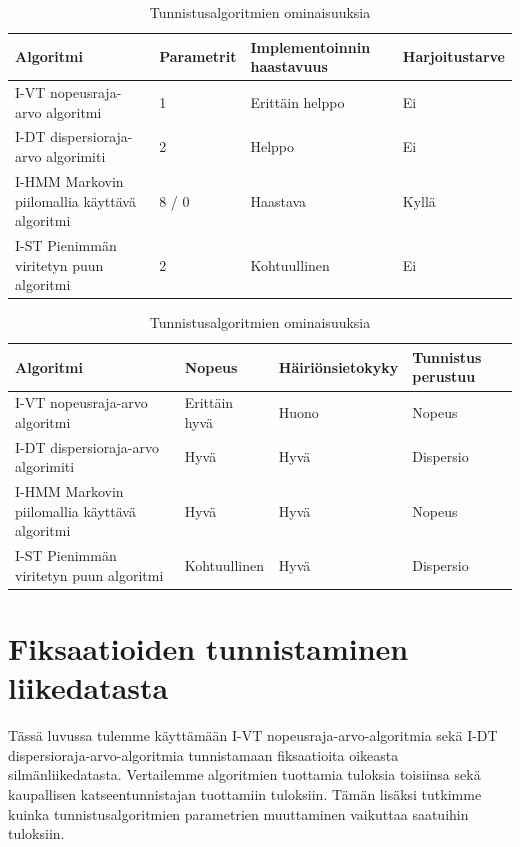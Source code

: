 		\begin{table}
    \begin{tabular}{| p{4cm} | p{3cm} | p{3cm}| p{3.5cm} |}
    \hline
    Algoritmi & Parametrit & Implementoinnin haastavuus & Harjoitustarve \\ \hline
    I-VT nopeusraja-arvo algoritmi & 1 & Erittäin helppo & Ei\\ \hline
    I-DT dispersioraja-arvo algorimiti & 2 & Helppo & Ei \\ \hline
    I-HMM Markovin piilomallia käyttävä algoritmi & 8 / 0 & Haastava & Kyllä \\ \hline
		I-ST Pienimmän viritetyn puun algoritmi & 2 & Kohtuullinen & Ei \\
    \hline
    \end{tabular}
		
		\vspace*{0.2 cm}
		
    \begin{tabular}{| p{4cm} | p{3cm} | p{3cm} |  p{3.5cm} |}
    \hline
    Algoritmi & Nopeus & Häiriönsietokyky & Tunnistus perustuu  \\ \hline
    I-VT nopeusraja-arvo algoritmi  & Erittäin hyvä & Huono  & Nopeus \\ \hline
    I-DT dispersioraja-arvo algorimiti  & Hyvä & Hyvä & Dispersio\\ \hline
    I-HMM Markovin piilomallia käyttävä algoritmi & Hyvä & Hyvä & Nopeus \\ \hline
		I-ST Pienimmän viritetyn puun algoritmi & Kohtuullinen & Hyvä & Dispersio \\
    \hline
    \end{tabular}
		
		\caption{Tunnistusalgoritmien ominaisuuksia}
		\label{table:alg_ominaisuudet}
		\end{table}
\newpage

\section{Fiksaatioiden tunnistaminen liikedatasta}

Tässä luvussa tulemme käyttämään I-VT nopeusraja-arvo-algoritmia sekä I-DT dispersioraja-arvo-algoritmia tunnistamaan fiksaatioita oikeasta silmänliikedatasta. Vertailemme algoritmien tuottamia tuloksia toisiinsa sekä kaupallisen katseentunnistajan tuottamiin tuloksiin. Tämän lisäksi tutkimme kuinka tunnistusalgoritmien parametrien muuttaminen vaikuttaa saatuihin tuloksiin.

